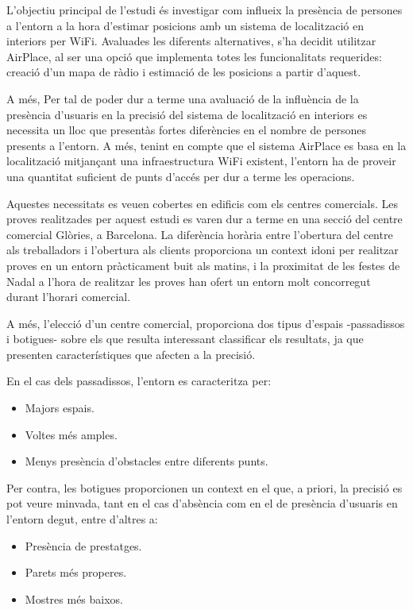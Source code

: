 
L'objectiu principal de l'estudi és investigar com influeix la presència de persones a l'entorn a la hora d'estimar posicions amb un sistema de localització en interiors per WiFi. Avaluades les diferents alternatives, s'ha decidit utilitzar AirPlace, al ser una opció que implementa totes les funcionalitats requerides: creació d'un mapa de ràdio i estimació de les posicions a partir d'aquest.

A més, Per tal de poder dur a terme una avaluació de la influència de la presència d'usuaris en la precisió del sistema de localització en interiors es necessita un lloc que presentàs fortes diferències en el nombre de persones presents a l'entorn. A més, tenint en compte que el sistema AirPlace es basa en la localització mitjançant una infraestructura WiFi existent, l'entorn ha de proveir una quantitat suficient de punts d'accés per dur a terme les operacions.

Aquestes necessitats es veuen cobertes en edificis com els centres comercials. Les proves realitzades per aquest estudi es varen dur a terme en una secció del centre comercial Glòries, a Barcelona. La diferència horària entre l'obertura del centre als treballadors i l'obertura als clients proporciona un context idoni per realitzar proves en un entorn pràcticament buit als matins, i la proximitat de les festes de Nadal a l'hora de realitzar les proves han ofert un entorn molt concorregut durant l'horari comercial.

A més, l'elecció d'un centre comercial, proporciona dos tipus d'espais -passadissos i botigues- sobre els que resulta interessant classificar els resultats, ja que presenten característiques que afecten a la precisió.

En el cas dels passadissos, l'entorn es caracteritza per:

\begin{itemize}
    \item Majors espais.
    \item Voltes més amples.
    \item Menys presència d'obstacles entre diferents punts.
\end{itemize}

Per contra, les botigues proporcionen un context en el que, a priori, la precisió es pot veure minvada, tant en el cas d'absència com en el de presència d'usuaris en l'entorn degut, entre d'altres a:

\begin{itemize}
    \item Presència de prestatges.
    \item Parets més properes.
    \item Mostres més baixos.
\end{itemize}

